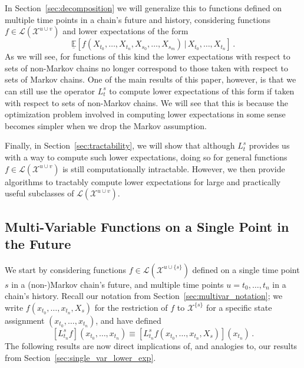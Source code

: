 \documentclass[10pt]{paper}
\theoremstyle{definition}
\newcommand{\states}{\mathcal{X}}
\newcommand{\gambles}{\mathcal{L}}
\begin{document}
In Section~\ref{sec:decomposition} we will generalize this to functions defined on multiple time points in a chain's future and history, considering functions $f\in\gambles(\states^{u\cup v})$ and lower expectations of the form
\begin{equation*}
\underline{\mathbb{E}}\left[f(X_{t_0},\ldots,X_{t_n},X_{s_0},\ldots,X_{s_m})\,\vert\,X_{t_0},\ldots,X_{t_n}\right]\,.
\end{equation*}
As we will see, for functions of this kind the lower expectations with respect to sets of non-Markov chains no longer correspond to those taken with respect to sets of Markov chains. One of the main results of this paper, however, is that we can still use the operator $L_t^s$ to compute lower expectations of this form if taken with respect to sets of non-Markov chains. We will see that this is because the optimization problem involved in computing lower expectations in some sense becomes simpler when we drop the Markov assumption.

Finally, in Section~\ref{sec:tractability}, we will show that although $L_t^s$ provides us with a way to compute such lower expectations, doing so for general functions $f\in\gambles(\states^{u\cup v})$ is still computationally intractable. However, we then provide algorithms to tractably compute lower expectations for large and practically useful subclasses of $\gambles(\states^{u\cup v})$.

\subsection{Multi-Variable Functions on a Single Point in the Future}\label{sec:function_single_future_multiple_past}

We start by considering functions $f\in\gambles(\states^{u\cup\{s\}})$ defined on a single time point $s$ in a (non-)Markov chain's future, and multiple time points $u=t_0,\ldots,t_n$ in a chain's history. Recall our notation from Section~\ref{sec:multivar_notation}; we write $f(x_{t_0},\ldots,x_{t_n},X_s)$ for the restriction of $f$ to $\states^{\{s\}}$ for a specific state assignment $(x_{t_0},\ldots,x_{t_n})$, and have defined
\begin{equation*}
\left[L_{t_n}^sf\right](x_{t_0},\ldots,x_{t_n}) \equiv \left[L_{t_n}^sf(x_{t_0},\ldots,x_{t_n},X_s)\right](x_{t_n})\,.
\end{equation*}
The following results are now direct implications of, and analogies to, our results from Section~\ref{sec:single_var_lower_exp}.
\end{document}
